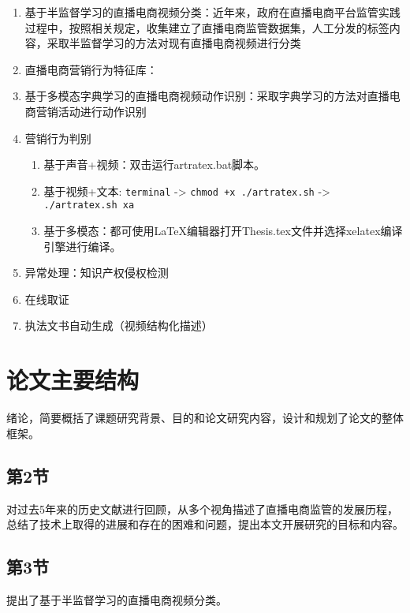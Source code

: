 \begin{enumerate}
    \item 基于半监督学习的直播电商视频分类：近年来，政府在直播电商平台监管实践过程中，按照相关规定，收集建立了直播电商监管数据集，人工分发的标签内容，采取半监督学习的方法对现有直播电商视频进行分类
    \item 直播电商营销行为特征库：
    \item 基于多模态字典学习的直播电商视频动作识别：采取字典学习的方法对直播电商营销活动进行动作识别

    \item 营销行为判别
        \begin{enumerate}
            \item 基于声音+视频：双击运行artratex.bat脚本。
            \item 基于视频+文本: {\scriptsize \verb|terminal| -> \verb|chmod +x ./artratex.sh| -> \verb|./artratex.sh xa|}
            \item 基于多模态：都可使用\LaTeX{}编辑器打开Thesis.tex文件并选择xelatex编译引擎进行编译。
        \end{enumerate}
    \item 异常处理：知识产权侵权检测 %
    \item 在线取证
    \item 执法文书自动生成（视频结构化描述）
\end{enumerate}


\section{论文主要结构}
绪论，简要概括了课题研究背景、目的和论文研究内容，设计和规划了论文的整体框架。

\subsection{第2节}
对过去5年来的历史文献进行回顾，从多个视角描述了直播电商监管的发展历程，总结了技术上取得的进展和存在的困难和问题，提出本文开展研究的目标和内容。

\subsection{第3节}
提出了基于半监督学习的直播电商视频分类。


